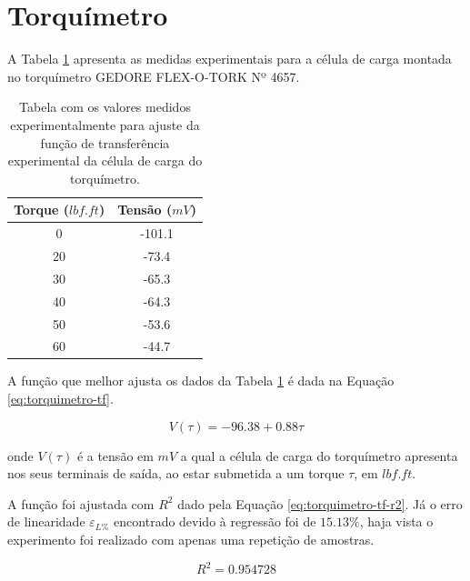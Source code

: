 \documentclass[a4paper]{instrumentacao}
\begin{document}
\section{Torquímetro}
A Tabela \ref{tab:torquimetro-resultado-funcao-transferencia} apresenta as medidas experimentais para a célula de carga montada no torquímetro GEDORE FLEX-O-TORK Nº 4657.

\begin{table}[H]
\centering
\caption{Tabela com os valores medidos experimentalmente para ajuste da função de transferência experimental da célula de carga do torquímetro.}
\label{tab:torquimetro-resultado-funcao-transferencia}
\begin{tabular}{|c|c|}
\hline
\textbf{Torque ($lbf.ft$)} & \textbf{Tensão ($mV$)} \\ \hline
0                        & -101.1               \\ \hline
20                       & -73.4                \\ \hline
30                       & -65.3                \\ \hline
40                       & -64.3                \\ \hline
50                       & -53.6                \\ \hline
60                       & -44.7                \\ \hline
\end{tabular}
\end{table}

A função que melhor ajusta os dados da Tabela \ref{tab:torquimetro-resultado-funcao-transferencia} é dada na Equação \ref{eq:torquimetro-tf}.

\begin{equation}
	V(\tau) = -96.38 + 0.88 \tau
	\label{eq:torquimetro-tf}
\end{equation}

\noindent onde $V(\tau)$ é a tensão em $mV$ a qual a célula de carga do torquímetro apresenta nos seus terminais de saída, ao estar submetida a um torque $\tau$, em $lbf.ft$. 

A função foi ajustada com $R^2$ dado pela Equação \ref{eq:torquimetro-tf-r2}. Já o erro de linearidade $\varepsilon_{L\%}$ encontrado devido à regressão foi de $15.13\%$, haja vista o experimento foi realizado com apenas uma repetição de amostras.

\begin{equation}
	R^2 = 0.954728
	\label{eq:torquimetro-tf-r2}
\end{equation}
\end{document}
